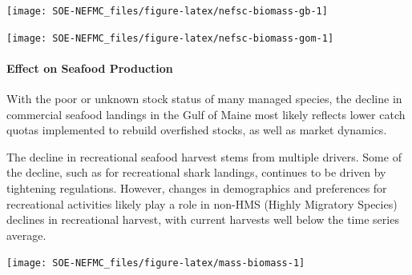 \documentclass[
  10pt,
]{article}
\let\origfigure\figure
\let\endorigfigure\endfigure
\renewenvironment{figure}[1][2] {
    \expandafter\origfigure\expandafter[H]
} {
    \endorigfigure
}
\begin{document}
\begin{figure}

{\centering \texttt{[image: SOE-NEFMC\_files/figure-latex/nefsc-biomass-gb-1]} 

}

\caption{Spring (left) and fall (right) surveyed biomass on Georges Bank. The shaded area around each annual mean represents 2 standard deviations from the mean.}\label{fig:nefsc-biomass-gb}
\end{figure}

\begin{figure}

{\centering \texttt{[image: SOE-NEFMC\_files/figure-latex/nefsc-biomass-gom-1]} 

}

\caption{Spring (left) and fall (right) surveyed biomass in the Gulf of Maine. The shaded area around each annual mean represents 2 standard deviations from the mean.}\label{fig:nefsc-biomass-gom}
\end{figure}

\hypertarget{effect-on-seafood-production}{%
\paragraph{Effect on Seafood Production}\label{effect-on-seafood-production}}

With the poor or unknown stock status of many managed species, the decline in commercial seafood landings in the Gulf of Maine most likely reflects lower catch quotas implemented to rebuild overfished stocks, as well as market dynamics.

The decline in recreational seafood harvest stems from multiple drivers. Some of the decline, such as for recreational shark landings, continues to be driven by tightening regulations. However, changes in demographics and preferences for recreational activities likely play a role in non-HMS (Highly Migratory Species) declines in recreational harvest, with current harvests well below the time series average.

\begin{figure}

{\centering \texttt{[image: SOE-NEFMC\_files/figure-latex/mass-biomass-1]} 

}

\caption{Spring (left) and fall (right) surveyed biomass from the state of Massachusetts inshore survey. The shaded area around each annual mean represents 2 standard deviations from the mean.}\label{fig:mass-biomass}
\end{figure}
\end{document}
